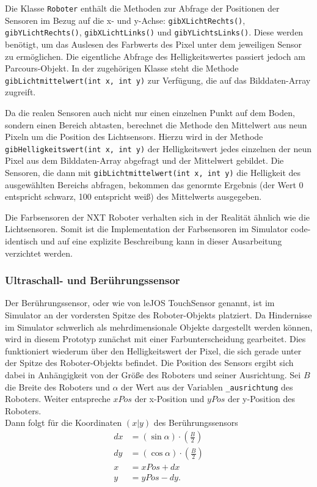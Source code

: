\documentclass[paper=a4, DIV=calc, BCOR=12mm, twoside=on, onecolumn=on, open = right, titlepage =on, parskip =half-, headsepline = on, footsepline = off, chapterprefix = off, appendixprefix = on, fontsize = 12pt, numbers = noenddot, abstract = on]{scrbook}
\begin{document}
Die Klasse \texttt{Roboter} enthält die Methoden zur Abfrage der Positionen der Sensoren im Bezug auf die x- und y-Achse: \texttt{gib\-X\-Licht\-Rechts()}, \texttt{gib\-Y\-Licht\-Rechts()}, \texttt{gib\-X\-Licht\-Links()} und \texttt{gibYLichtsLinks()}. Diese werden benötigt, um das Auslesen des Farbwerts des Pixel unter dem jeweiligen Sensor zu ermöglichen. Die eigentliche Abfrage des Helligkeitswertes passiert jedoch am Parcours-Objekt. In der zugehörigen Klasse steht die Methode \texttt{gibLichtmittelwert(int x, int y)} zur Verfügung, die auf das Bilddaten-Array zugreift.

Da die realen Sensoren auch nicht nur einen einzelnen Punkt auf dem Boden, sondern einen Bereich abtasten, berechnet die Methode den Mittelwert aus neun Pixeln um die Position des Lichtsensors. Hierzu wird in der Methode \texttt{gib\-Hellig\-keits\-wert(int x, int y)} der Helligkeitswert jedes einzelnen der neun Pixel aus dem Bilddaten-Array abgefragt und der Mittelwert gebildet. Die Sensoren, die dann mit \texttt{gib\-Licht\-mittel\-wert(int x, int y)} die Helligkeit des ausgewählten Bereichs abfragen, bekommen das genormte Ergebnis (der Wert 0 entspricht schwarz, 100 entspricht weiß) des Mittelwerts ausgegeben.

Die Farbsensoren der NXT Roboter verhalten sich in der Realität ähnlich wie die Lichtsensoren. Somit ist die Implementation der Farbsensoren im Simulator code-identisch und auf eine explizite Beschreibung kann in dieser Ausarbeitung verzichtet werden.

\subsubsection{Ultraschall- und Berührungssensor}
Der Berührungssensor, oder wie von leJOS TouchSensor genannt, ist im Simulator an der vordersten Spitze des Roboter-Objekts platziert. Da Hindernisse im Simulator schwerlich als mehrdimensionale Objekte dargestellt werden können, wird in diesem Prototyp zunächst mit einer Farbunterscheidung gearbeitet. Dies funktioniert wiederum über den Helligkeitswert der Pixel, die sich gerade unter der Spitze des Roboter-Objekts befindet. Die Position des Sensors ergibt sich dabei in Anhängigkeit von der Größe des Roboters und seiner Ausrichtung. Sei $B$ die Breite des Roboters und $\alpha$ der Wert aus der Variablen \texttt{{\_}ausrichtung} des Roboters. Weiter entspreche $xPos$ der x-Position und $yPos$ der y-Position des Roboters.\\
Dann folgt für die Koordinaten $\left( x \vert y \right)$ des Berührungssensors
\begin{align*}
dx & = \left( \sin \alpha \right) \cdot \left( \frac{B}{2} \right)\\
dy & = \left( \cos \alpha \right) \cdot \left( \frac{B}{2} \right)\\
 x & = xPos + dx\\
 y & = yPos - dy.
\end{align*}
\end{document}
